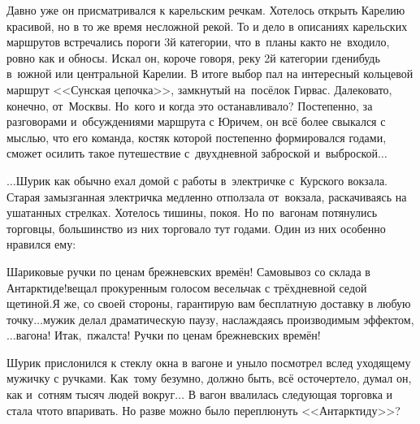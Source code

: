{	Давно уже он присматривался к карельским речкам. Хотелось открыть Карелию красивой, но в то же время несложной рекой. То и дело в описаниях карельских маршрутов встречались пороги 3\sdash й категории, что в~планы как\sdash то не~входило, ровно как и обносы. Искал он, короче говоря, реку 2\sdash й категории где\sdash нибудь в~южной или центральной Карелии. В итоге выбор пал на интересный кольцевой маршрут <<Сунская цепочка>>, замкнутый на~посёлок Гирвас. Далековато, конечно, от~Москвы. Но~кого и когда это останавливало? Постепенно, за разговорами и~обсуждениями маршрута с Юричем, он всё более свыкался с мыслью, что его команда, костяк которой постепенно формировался годами, сможет осилить такое путешествие с~двухдневной заброской и~выброской$\ldots$ 
	
	$\ldots$Шурик как обычно ехал домой с работы в~электричке с~Курского вокзала. Старая замызганная электричка медленно отползала от~вокзала, раскачиваясь на ушатанных стрелках. Хотелось тишины, покоя. Но по~вагонам потянулись торговцы, большинство из них торговало тут годами. Один из них особенно нравился ему:
	
	\diagdash Шариковые ручки по ценам брежневских времён! Самовывоз со склада в Антарктиде!\mdash вещал прокуренным голосом весельчак с трёхдневной седой щетиной.\mdash Я же, со своей стороны, гарантирую вам бесплатную доставку в любую точку$\ldots$\mdash мужик делал драматическую паузу, наслаждаясь производимым эффектом,\mdash $\ldots$вагона! Итак,~п\sdash жалста! Ручки по ценам брежневских времён!%
	
	Шурик прислонился к стеклу окна в вагоне и уныло посмотрел вслед уходящему мужичку с ручками. Как~тому безумно, должно быть, всё осточертело, думал он, как и~сотням тысяч людей вокруг$\ldots$ В вагон ввалилась следующая торговка и стала что\sdash то впаривать. Но разве можно было переплюнуть <<Антарктиду>>? 
		
}
